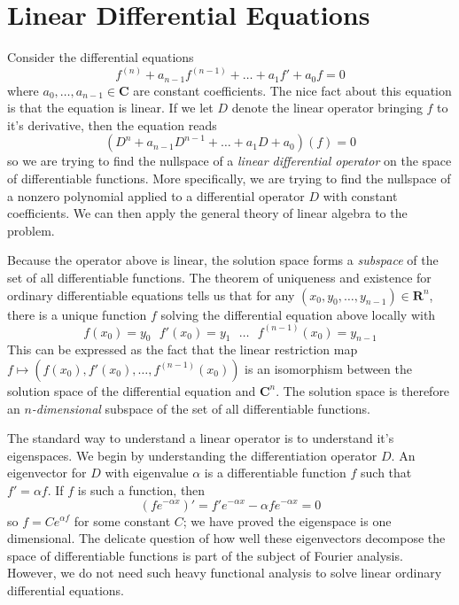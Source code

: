\section{Linear Differential Equations}

Consider the differential equations
%
\[ f^{(n)} + a_{n-1}f^{(n-1)} + \dots + a_1f' + a_0f = 0 \]
%
where $a_0, \dots, a_{n-1} \in \mathbf{C}$ are constant coefficients. The nice fact about this equation is that the equation is linear. If we let $D$ denote the linear operator bringing $f$ to it's derivative, then the equation reads
%
\[ (D^n + a_{n-1}D^{n-1} + \dots + a_1D + a_0)(f) = 0 \]
%
so we are trying to find the nullspace of a {\it linear differential operator} on the space of differentiable functions. More specifically, we are trying to find the nullspace of a nonzero polynomial applied to a differential operator $D$ with constant coefficients. We can then apply the general theory of linear algebra to the problem.

Because the operator above is linear, the solution space forms a {\it subspace} of the set of all differentiable functions. The theorem of uniqueness and existence for ordinary differentiable equations tells us that for any $(x_0,y_0, \dots, y_{n-1}) \in \mathbf{R}^n$, there is a unique function $f$ solving the differential equation above locally with
%
\[ f(x_0) = y_0\ \ \ f'(x_0) = y_1\ \ \ \dots\ \ \ f^{(n-1)}(x_0) = y_{n-1} \]
%
This can be expressed as the fact that the linear restriction map $f \mapsto (f(x_0), f'(x_0), \dots, f^{(n-1)}(x_0))$ is an isomorphism between the solution space of the differential equation and $\mathbf{C}^n$. The solution space is therefore an {\it $n$-dimensional} subspace of the set of all differentiable functions.

The standard way to understand a linear operator is to understand it's eigenspaces. We begin by understanding the differentiation operator $D$. An eigenvector for $D$ with eigenvalue $\alpha$ is a differentiable function $f$ such that $f' = \alpha f$. If $f$ is such a function, then
%
\[ (fe^{-\alpha x})' = f'e^{-\alpha x} - \alpha f e^{-\alpha x} = 0 \]
%
so $f = Ce^{\alpha f}$ for some constant $C$; we have proved the eigenspace is one dimensional. The delicate question of how well these eigenvectors decompose the space of differentiable functions is part of the subject of Fourier analysis. However, we do not need such heavy functional analysis to solve linear ordinary differential equations.

